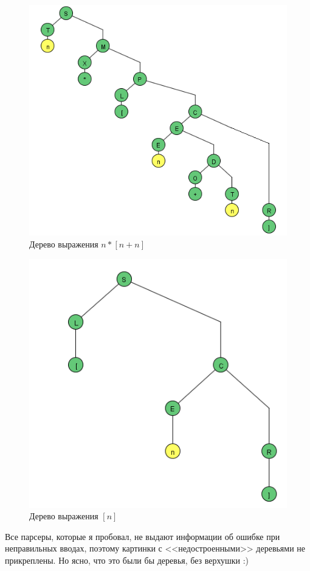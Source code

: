 \begin{figure}[ht!]
\centering
\includegraphics[scale=0.5]{t2.png}
\caption{Дерево выражения $n*[n+n]$}
\end{figure}

\begin{figure}[ht!]
\centering
\includegraphics[scale=0.5]{t3.png}
\caption{Дерево выражения $[n]$}
\end{figure}

Все парсеры, которые я пробовал, не выдают информации об ошибке при неправильных вводах, поэтому картинки с <<недостроенными>> деревьями не прикреплены. Но ясно, что это были бы деревья, без верхушки :)

